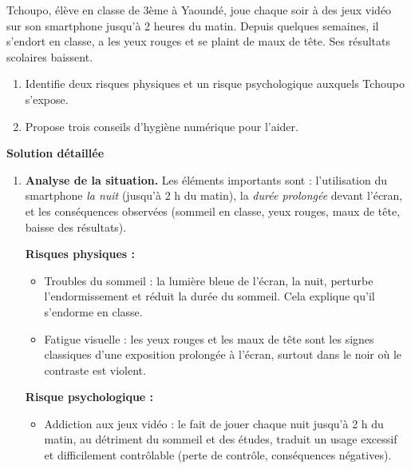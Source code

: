 \documentclass[11pt]{article}
\newcommand{\cle}[1]{{\popxbold\color{popdark}#1}}
\begin{document}
\begin{exoresolu}
Tchoupo, élève en classe de 3ème à Yaoundé, joue chaque soir à des jeux vidéo sur son smartphone jusqu'à 2 heures du matin. Depuis quelques semaines, il s'endort en classe, a les yeux rouges et se plaint de maux de tête. Ses résultats scolaires baissent.
\begin{enumerate}
\item Identifie deux risques physiques et un risque psychologique auxquels Tchoupo s'expose.
\item Propose trois conseils d'hygiène numérique pour l'aider.
\end{enumerate}
\tcblower
\textbf{Solution détaillée}
\begin{enumerate}
\item \textbf{Analyse de la situation.} Les éléments importants sont : l'utilisation du smartphone \emph{la nuit} (jusqu'à 2 h du matin), la \emph{durée prolongée} devant l'écran, et les conséquences observées (sommeil en classe, yeux rouges, maux de tête, baisse des résultats).

\textbf{Risques physiques :}
\begin{itemize}
\item \cle{Troubles du sommeil} : la lumière bleue de l'écran, la nuit, perturbe l'endormissement et réduit la durée du sommeil. Cela explique qu'il s'endorme en classe.
\item \cle{Fatigue visuelle} : les yeux rouges et les maux de tête sont les signes classiques d'une exposition prolongée à l'écran, surtout dans le noir où le contraste est violent.
\end{itemize}
\textbf{Risque psychologique :}
\begin{itemize}
\item \cle{Addiction aux jeux vidéo} : le fait de jouer chaque nuit jusqu'à 2 h du matin, au détriment du sommeil et des études, traduit un usage excessif et difficilement contrôlable (perte de contrôle, conséquences négatives).
\end{itemize}


\end{enumerate}
\end{exoresolu}
\end{document}
